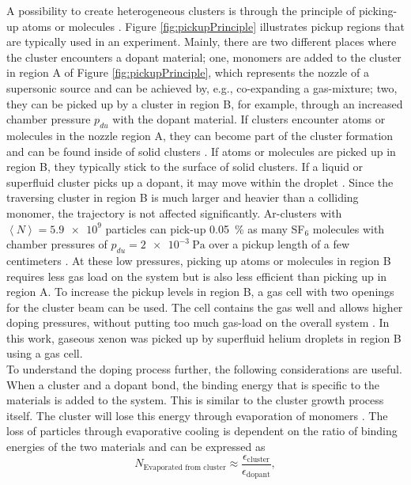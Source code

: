 A possibility to create heterogeneous clusters is through the principle of picking-up atoms or molecules \citep{Haberland-1994-Springer}. Figure \ref{fig:pickupPrinciple} illustrates pickup regions that are typically used in an experiment. Mainly, there are two different places where the cluster encounters a dopant material; one, monomers are added to the cluster in region A of Figure \ref{fig:pickupPrinciple}, which represents the nozzle of a supersonic source and can be achieved by, e.g., co-expanding a gas-mixture; two, they can be picked up by a cluster in region B, for example, through an increased chamber pressure $p_{du}$ with the dopant material. If clusters encounter atoms or molecules in the nozzle region A, they can become part of the cluster formation and can be found inside of solid clusters \citep{Gough-1985-JChemPhys}. If atoms or molecules are picked up in region B, they typically stick to the surface of solid clusters. If a liquid or superfluid cluster picks up a dopant, it may move within the droplet \cite{Hartmann-1995-PRL}. Since the traversing cluster in region B is much larger and heavier than a colliding monomer, the trajectory is not affected significantly. Ar-clusters with $\left\langle N\right\rangle = \num{5.9e9}$ particles can pick-up \SI{0.05}{\percent} as many SF$_{6}$ molecules with chamber pressures of $p_{du}=\SI{2e-3}{\pascal}$ over a pickup length of a few centimeters \citep{Gough-1985-JChemPhys}. At these low pressures, picking up atoms or molecules in region B requires less gas load on the system but is also less efficient than picking up in region A. To increase the pickup levels in region B, a gas cell with two openings for the cluster beam can be used. The cell contains the gas well and allows higher doping pressures, without putting too much gas-load on the overall system \cite{Gomez-2014-Science}. In this work, gaseous xenon was picked up by superfluid helium droplets in region B using a gas cell.\\[1\baselineskip]
%
To understand the doping process further, the following considerations are useful. When a cluster and a dopant bond, the binding energy that is specific to the materials is added to the system. This is similar to the cluster growth process itself. The cluster will lose this energy through evaporation of monomers \citep{Gomez-2011-JCP}. The loss of particles through evaporative cooling is dependent on the ratio of binding energies of the two materials and can be expressed as
\begin{equation}
N_{\text{Evaporated from cluster}} \approx \frac{\epsilon_{\text{cluster}}}{\epsilon_{\text{dopant}}},
\label{eq:evaporated-amount}
\end{equation}
